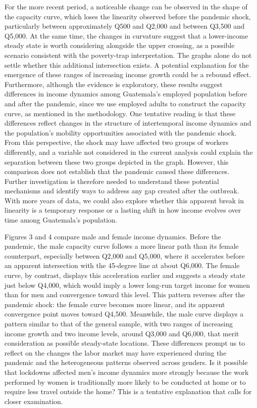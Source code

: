 \documentclass{article}
\begin{document}
For the more recent period, a noticeable change can be observed in the shape of the capacity curve, which loses the linearity observed before the pandemic shock, particularly between approximately Q500 and Q2,000 and between Q3,500 and Q5,000. At the same time, the changes in curvature suggest that a lower-income steady state is worth considering alongside the upper crossing, as a possible scenario consistent with the poverty-trap interpretation. The graphs alone do not settle whether this additional intersection exists. A potential explanation for the emergence of these ranges of increasing income growth could be a rebound effect. Furthermore, although the evidence is exploratory, these results suggest differences in income dynamics among Guatemala's employed population before and after the pandemic, since we use employed adults to construct the capacity curve, as mentioned in the methodology. One tentative reading is that these differences reflect changes in the structure of intertemporal income dynamics and the population's mobility opportunities associated with the pandemic shock. From this perspective, the shock may have affected two groups of workers differently, and a variable not considered in the current analysis could explain the separation between these two groups depicted in the graph. However, this comparison does not establish that the pandemic caused these differences. Further investigation is therefore needed to understand these potential mechanisms and identify ways to address any gap created after the outbreak. With more years of data, we could also explore whether this apparent break in linearity is a temporary response or a lasting shift in how income evolves over time among Guatemala's population.

Figures 3 and 4 compare male and female income dynamics. Before the pandemic, the male capacity curve follows a more linear path than its female counterpart, especially between Q2,000 and Q5,000, where it accelerates before an apparent intersection with the 45-degree line at about Q6,000. The female curve, by contrast, displays this acceleration earlier and suggests a steady state just below Q4,000, which would imply a lower long-run target income for women than for men and convergence toward this level. This pattern reverses after the pandemic shock: the female curve becomes more linear, and its apparent convergence point moves toward Q4,500. Meanwhile, the male curve displays a pattern similar to that of the general sample, with two ranges of increasing income growth and two income levels, around Q3,000 and Q6,000, that merit consideration as possible steady-state locations. These differences prompt us to reflect on the changes the labor market may have experienced during the pandemic and the heterogeneous patterns observed across genders. Is it possible that lockdowns affected men's income dynamics more strongly because the work performed by women is traditionally more likely to be conducted at home or to require less travel outside the home? This is a tentative explanation that calls for closer examination.
\end{document}
